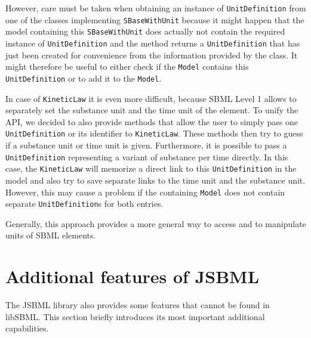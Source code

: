 \documentclass[
  BCOR12mm,
  letterpaper,
  11pt,
  headsepline,
  pointlessnumbers,
  tablecaptionabove,
  onelinecaption,
  headinclude,
  appendixprefix,
  idxtotoc,
  bibtotoc,
  twoside,
  titlepage
]{scrartcl}
\begin{document}
However, care must be taken when obtaining an instance of \texttt{UnitDefinition}
from one of the classes implementing \texttt{SBaseWithUnit}
because it might happen that the model containing this \texttt{SBaseWithUnit}
does actually not contain the required instance of \texttt{UnitDefinition} and
the method returns a \texttt{UnitDefinition} that has just been created for
convenience from the information provided by the class. It might therefore be
useful to either check if the \texttt{Model} contains this
\texttt{UnitDefinition}
or to add it to the \texttt{Model}.

In case of \texttt{KineticLaw}
it is even more difficult, because
SBML Level 1 allows to separately set the substance unit and the time unit of
the element. To unify the API, we decided to also provide methods that allow
the user to simply pass one \texttt{UnitDefinition}
or its identifier to
\texttt{KineticLaw}.
These methods then try to guess if a substance unit or time
unit is given. Furthermore, it is possible to pass a \texttt{UnitDefinition}
representing a variant of substance per time directly. In this case, the
\texttt{KineticLaw}
will memorize a direct link to this \texttt{UnitDefinition}
in the model and also try to save separate links to the time unit and the
substance unit. However, this may cause a problem if the containing
\texttt{Model} does not contain separate \texttt{UnitDefinition}s for both
entries.

Generally, this approach provides a more general way to access and to manipulate
units of SBML elements.

\section{Additional features of JSBML}

The JSBML library also provides some features that cannot be found in libSBML.
This section briefly introduces its most important additional capabilities.
\end{document}
